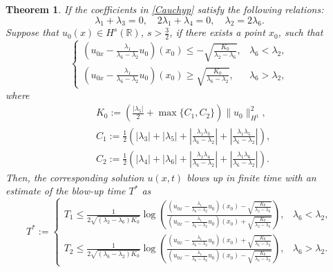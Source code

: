 \documentclass[11pt]{article}
\newtheorem{theorem}{Theorem}
\begin{document}
\begin{theorem}\label{WBP}
If the coefficients in \eqref{Cauchyp} satisfy the following relations:
\begin{equation*}%
\lambda_1+\lambda_3=0,\quad 2\lambda_1+\lambda_4 =0,\quad \lambda_2 = 2\lambda_6.
\end{equation*}
Suppose that $u_0(x)\in H^s(\mathbb{R})$, $s>\frac{3}{2}$, if there exists a point $x_0$, such that 
\begin{equation}\label{BLC}
\left\{
  \begin{array}{ll}
 \left(u_{0x} -\frac{\lambda_1}{\lambda_6-\lambda_2}u_0\right)(x_0)
\leq -\sqrt{\frac{K_0}{\lambda_2-\lambda_6}}, 
&\lambda_6<\lambda_2, \\
 \left(u_{0x} -\frac{\lambda_1}{\lambda_6-\lambda_2}u_0\right)(x_0)
\geq \sqrt{\frac{K_0}{\lambda_6-\lambda_2}}, 
&\lambda_6>\lambda_2,
  \end{array}
\right.
\end{equation}
where 
\begin{equation}\label{KCC}
 \begin{aligned}
&K_0:=\left(\frac{|\lambda_5|}{2}+\max\{C_1,C_2\}\right)\|u_0\|_{H^1}^2,\\
&C_1:=\frac{1}{2}\left(|\lambda_3|+|\lambda_5|
+\left|\frac{\lambda_1\lambda_3}{\lambda_6-\lambda_2}\right|
+\left|\frac{\lambda_1\lambda_5}{\lambda_6-\lambda_2}\right|\right),\\
&C_2:=\frac{1}{2}\left(|\lambda_4|+|\lambda_6|
+\left|\frac{\lambda_1\lambda_4}{\lambda_6-\lambda_2}\right|
+\left|\frac{\lambda_1\lambda_6}{\lambda_6-\lambda_2}\right|\right).
\end{aligned}
\end{equation}
Then, the corresponding solution $u(x,t)$ blows up in finite time with an
estimate of the blow-up time $T^*$ as
\begin{equation*}
T^*:=\left\{
\begin{array}{ll}
T_1\leq \frac{1}{2\sqrt{(\lambda_2-\lambda_6)K_0}}
\log\left( \frac{\left(u_{0x} -\frac{\lambda_1}{\lambda_6-\lambda_2}u_0\right)(x_0)
-\sqrt{\frac{K_0}{\lambda_2-\lambda_6}}}
{\left(u_{0x} -\frac{\lambda_1}{\lambda_6-\lambda_2}u_{0}\right)(x_0)
+\sqrt{\frac{K_0}{\lambda_2-\lambda_6}}}\right), & \lambda_6<\lambda_2, \\
T_2\leq \frac{1}{2\sqrt{(\lambda_6-\lambda_2)K_0}}
\log\left( \frac{\left(u_{0x} -\frac{\lambda_1}{\lambda_6-\lambda_2}u_0\right)(x_0)
+\sqrt{\frac{K_0}{\lambda_6-\lambda_2}}}
{\left(u_{0x} -\frac{\lambda_1}{\lambda_6-\lambda_2}u_{0}\right)(x_0)
-\sqrt{\frac{K_0}{\lambda_6-\lambda_2}}}\right), & \lambda_6>\lambda_2.
       \end{array}
     \right.
\end{equation*}
\end{theorem}
\end{document}

